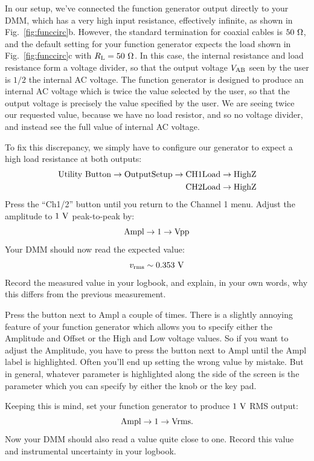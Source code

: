 In our setup, we've connected the function generator output directly
to your DMM, which has a very high input resistance, effectively
infinite, as shown in Fig.~\ref{fig:funccirc}b.  However, the standard
termination for coaxial cables is $50~\rm \Omega$, and the default
setting for your function generator expects the load shown in
Fig.~\ref{fig:funccirc}c with $R_{\rm L} = 50~\rm \Omega$.  In
this case, the internal resistance and load resistance form a voltage
divider, so that the output voltage $V_{\rm AB}$ seen by the user is
$1/2$ the internal AC voltage. The function generator is designed to
produce an internal AC voltage which is twice the value selected by
the user, so that the output voltage is precisely the value specified
by the user.  We are seeing twice our requested value, because we have
no load resistor, and so no voltage divider, and instead see the full
value of internal AC voltage.  
\begin{measurement} To fix this discrepancy, we simply have
to configure our generator to expect a high load resistance at both
outputs:
\begin{eqnarray*}
{\rm Utility~Button \to Output Setup \to CH1Load \to HighZ} \\
{\rm CH2Load \to HighZ}
\end{eqnarray*}
Press the ``Ch1/2'' button until you return to the Channel 1 menu.  Adjust the amplitude to $1~{\rm V}$ peak-to-peak by:
\begin{displaymath}
\rm Ampl \to 1 \to Vpp
\end{displaymath}
Your DMM should now read the expected value:
\begin{displaymath}
v_{\rm rms} \sim 0.353~\rm V
\end{displaymath}
Record the measured value in your logbook, and explain, in your own words, why this differs from the previous measurement.
\end{measurement}

Press the button next to Ampl a couple of times.  There is a slightly
annoying feature of your function generator which allows you to
specify either the Amplitude and Offset or the High and Low voltage
values.  So if you want to adjust the Amplitude, you have to press the
button next to Ampl until the Ampl label is highlighted.  Often you'll
end up setting the wrong value by mistake.  But in general, whatever
parameter is highlighted along the side of the screen is the parameter
which you can specify by either the knob or the key pad.  
\begin{measurement} Keeping this
is mind, set your function generator to produce $1~\rm V$ RMS output:
\begin{displaymath}
\rm Ampl \to 1 \to Vrms.
\end{displaymath}
Now your DMM should also read a value quite close to one. Record this
value and instrumental uncertainty in your logbook.
\end{measurement}

